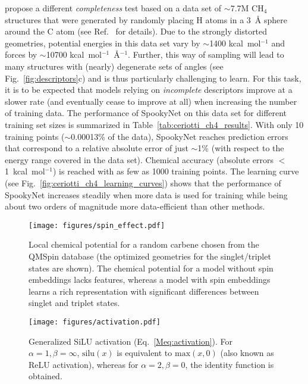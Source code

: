 \documentclass[%
superscriptaddress,
reprint,
nofootinbib,
amsmath,amssymb,amsfonts,
floatfix,
altaffilletter,
showkeys,
]{revtex4-2}
\newcommand{\nn}{SpookyNet}
\begin{document}
\citeauthor{pozdnyakov2020incompleteness} propose a different \emph{completeness} test based on a data set of $\sim$7.7M CH$_4$ structures\cite{ch4} that were generated by randomly placing H atoms in a 3~\AA{} sphere around the C atom (see Ref.~ for details). Due to the strongly distorted geometries, potential energies in this data set vary by $\sim$1400 kcal~mol$^{-1}$ and forces by $\sim$10700 kcal~mol$^{-1}$~\AA$^{-1}$. Further, this way of sampling will lead to many structures with (nearly) degenerate sets of angles (see Fig.~\ref{fig:descriptors}c) and is thus particularly challenging to learn. For this task, it is to be expected that models relying on \emph{incomplete} descriptors improve at a slower rate (and eventually cease to improve at all) when increasing the number of training data.\cite{pozdnyakov2020incompleteness} The performance of \nn{} on this data set for different training set sizes is summarized in Table~\ref{tab:ceriotti_ch4_results}. With only 10 training points ($\sim$0.00013\% of the data), \nn{} reaches prediction errors that correspond to a relative absolute error of just $\sim$1\% (with respect to the energy range covered in the data set). Chemical accuracy (absolute errors $<$1~kcal~mol$^{-1}$) is reached with as few as 1000 training points. The learning curve (see Fig.~\ref{fig:ceriotti_ch4_learning_curves}) shows that the performance of \nn{} increases steadily when more data is used for training while being about two orders of magnitude more data-efficient than other methods. 

\begin{figure*}
	\texttt{[image: figures/spin\_effect.pdf]}
	\caption{Local chemical potential for a random carbene chosen from the QMSpin database (the optimized geometries for the singlet/triplet states are shown). The chemical potential for a model without spin embeddings lacks features, whereas a model with spin embeddings learns a rich representation with significant differences between singlet and triplet states.}
	\label{fig:different_spin_gummybears}
\end{figure*}

\begin{figure*}
	\texttt{[image: figures/activation.pdf]}
	\caption{Generalized SiLU activation (Eq.~\ref{Meq:activation}). For $\alpha=1,\beta=\infty$, $\mathrm{silu}(x)$ is equivalent to $\mathrm{max}(x,0)$ (also known as $\mathrm{ReLU}$ activation), whereas for $\alpha=2,\beta=0$, the identity function is obtained.}
	\label{fig:activation}
\end{figure*}
\end{document}
